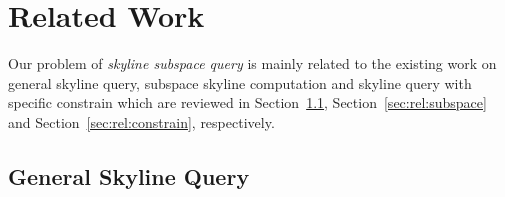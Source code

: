 
%
%

\chapter{Related Work}
\label{ch:related-work}

Our problem of \emph{skyline subspace query} is mainly related to the existing work on general skyline query, subspace skyline computation and skyline query with specific constrain which are reviewed in Section~\ref{sec:rel:general}, Section~\ref{sec:rel:subspace} and Section~\ref{sec:rel:constrain}, respectively.

\section{General Skyline Query}
\label{sec:rel:general}

